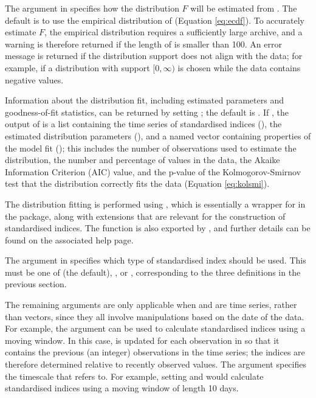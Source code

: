 \documentclass[article,shortnames,nojss]{jss}\usepackage[]{graphicx}\usepackage[]{xcolor}
\begin{document}
The  argument in  specifies how the distribution $F$ will be estimated from . The default is to use the empirical distribution of  (Equation \ref{eq:ecdf}). To accurately estimate $F$, the empirical distribution requires a sufficiently large archive, and a warning is therefore returned if the length of  is smaller than 100. An error message is returned if the distribution support does not align with the data; for example, if a distribution with support $[0, \infty)$ is chosen while the data contains negative values.

Information about the distribution fit, including estimated parameters and goodness-of-fit statistics, can be returned by setting ; the default is . If , the output of  is a list containing the time series of standardised indices (), the estimated distribution parameters (), and a named vector containing properties of the model fit (); this includes the number of observations used to estimate the distribution, the number and percentage of  values in the data, the Akaike Information Criterion (AIC) value, and the p-value of the Kolmogorov-Smirnov test that the distribution correctly fits the data (Equation \ref{eq:kolsmi}).

The distribution fitting is performed using , which is essentially a wrapper for  in the  package, along with extensions that are relevant for the construction of standardised indices. The  function is also exported by , and further details can be found on the associated help page.

The argument  in  specifies which type of standardised index should be used. This must be one of  (the default), , or , corresponding to the three definitions in the previous section.

The remaining arguments are only applicable when  and  are time series, rather than vectors, since they all involve manipulations based on the date of the data. For example, the argument  can be used to calculate standardised indices using a moving window. In this case,  is updated for each observation in  so that it contains the previous  (an integer) observations in the time series; the indices are therefore determined relative to recently observed values. The argument  specifies the timescale that  refers to. For example, setting  and  would calculate standardised indices using a moving window of length 10 days.
\end{document}
